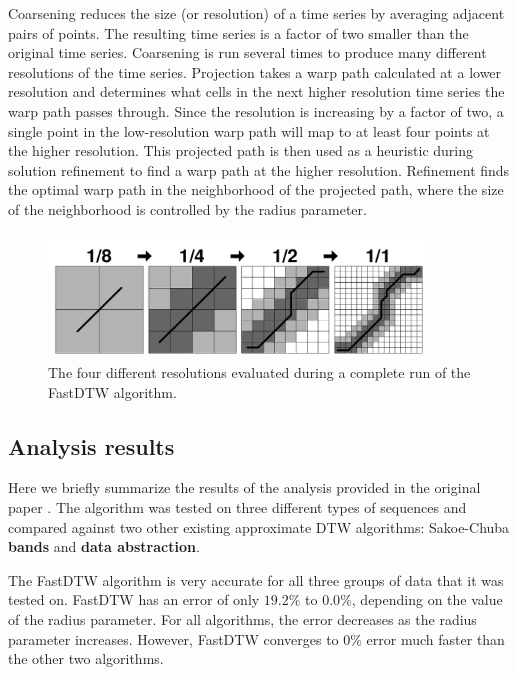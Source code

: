 Coarsening reduces the size (or resolution) of a time series by averaging adjacent pairs of points.
The resulting time series is a factor of two smaller than the original time series. Coarsening is
run several times to produce many different resolutions of the time series. Projection takes a warp
path calculated at a lower resolution and determines what cells in the next higher resolution time
series the warp path passes through. Since the resolution is increasing by a factor of two, a single
point in the low-resolution warp path will map to at least four points at the higher resolution.
This projected path is then used as a heuristic during solution refinement to find a warp path at
the higher resolution. Refinement finds the optimal warp path in the neighborhood of the projected
path, where the size of the neighborhood is controlled by the radius parameter.

\begin{figure}[H]
  \centerline{\includegraphics[width=0.9\textwidth]{images/fast_dtw.png}}
  \caption[The four different resolutions evaluated during a complete run of the FastDTW
  algorithm.]{The four different resolutions evaluated during a complete run of the FastDTW
  algorithm.}
  \label{obr:fast_dtw}
\end{figure}

\subsection{Analysis results}

Here we briefly summarize the results of the analysis provided in the original paper
\cite{toward_accurate__dtw}. The algorithm was tested on three different types of sequences and
compared against two other existing approximate DTW algorithms: Sakoe-Chuba \textbf{bands} and
\textbf{data abstraction}.

The FastDTW algorithm is very accurate for all three groups of data that it was tested on. FastDTW
has an error of only $19.2\%$ to $0.0\%$, depending on the value of the radius parameter. For all
algorithms, the error decreases as the radius parameter increases. However, FastDTW converges to
$0\%$ error much faster than the other two algorithms.

